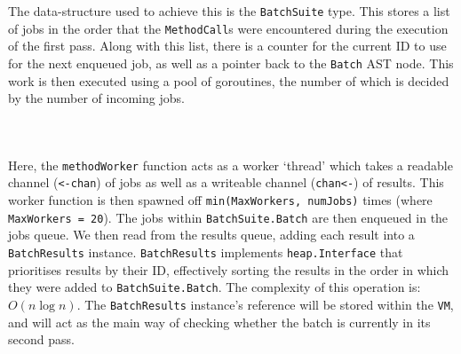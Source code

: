 The data-structure used to achieve this is the \verb|BatchSuite| type. This stores a list of jobs in the order that the \verb|MethodCall|s were encountered during the execution of the first pass. Along with this list, there is a counter for the current ID to use for the next enqueued job, as well as a pointer back to the \verb|Batch| AST node. This work is then executed using a pool of goroutines, the number of which is decided by the number of incoming jobs.

\inputminted[firstline=72, lastline=78, autogobble, breaklines, tabsize=4]{go}{../../src/batch.go}

\inputminted[firstline=89, lastline=102, autogobble, breaklines, tabsize=4]{go}{../../src/batch.go}

\inputminted[firstline=124, lastline=160, autogobble, breaklines, tabsize=4]{go}{../../src/batch.go}

Here, the \verb|methodWorker| function acts as a worker `thread' which takes a readable channel (\texttt{<-chan}) of jobs as well as a writeable channel (\texttt{chan<-}) of results. This worker function is then spawned off \verb|min(MaxWorkers, numJobs)| times (where \verb|MaxWorkers = 20|). The jobs within \verb|BatchSuite.Batch| are then enqueued in the jobs queue. We then read from the results queue, adding each result into a \verb|BatchResults| instance. \verb|BatchResults| implements \verb|heap.Interface| that prioritises results by their ID, effectively sorting the results in the order in which they were added to \verb|BatchSuite.Batch|. The complexity of this operation is: $O(n \log n)$. The \verb|BatchResults| instance's reference will be stored within the \verb|VM|, and will act as the main way of checking whether the batch is currently in its second pass.

